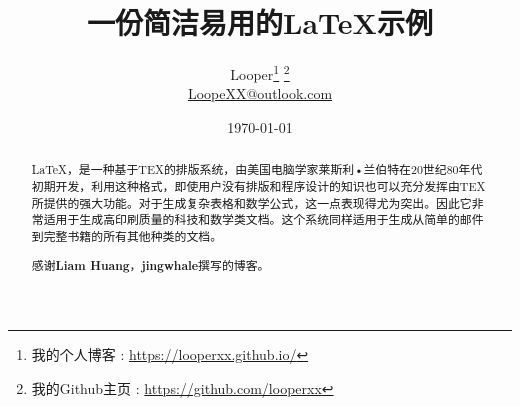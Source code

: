 \documentclass[UTF8]{ctexart}
\title{一份简洁易用的\LaTeX{}示例}
\author{Looper\footnote{我的个人博客 : \url{https://looperxx.github.io/}} \footnote{我的Github主页 : \url{https://github.com/looperxx}} \\ \normalsize \href{mailto:LoopeXX@outlook.com}{LoopeXX@outlook.com}}
\date{\today}
\begin{document}
\maketitle
\thispagestyle{empty} %


\begin{abstract}

\LaTeX{}，是一种基于TEX的排版系统，由美国电脑学家莱斯利•兰伯特在20世纪80年代初期开发，利用这种格式，即使用户没有排版和程序设计的知识也可以充分发挥由TEX所提供的强大功能。对于生成复杂表格和数学公式，这一点表现得尤为突出。因此它非常适用于生成高印刷质量的科技和数学类文档。这个系统同样适用于生成从简单的邮件到完整书籍的所有其他种类的文档。

感谢\textbf{Liam Huang}\cite{W:liam}，\textbf{jingwhale}\cite{W:jingwhale}撰写的博客。
\end{abstract}


\clearpage


\tableofcontents
\thispagestyle{empty} 

\newpage
\setcounter{page}{1} %

\pagestyle{fancy}
\chead{\date{\today}}                                              
\rhead{\small\leftmark}                                               
\lfoot{\LaTeX{}}    
\cfoot{\thepage}                                                
\renewcommand{\headrulewidth}{0.4pt}
\renewcommand{\headwidth}{\textwidth}
\renewcommand{\footrulewidth}{0.4pt}

 
\end{document}
